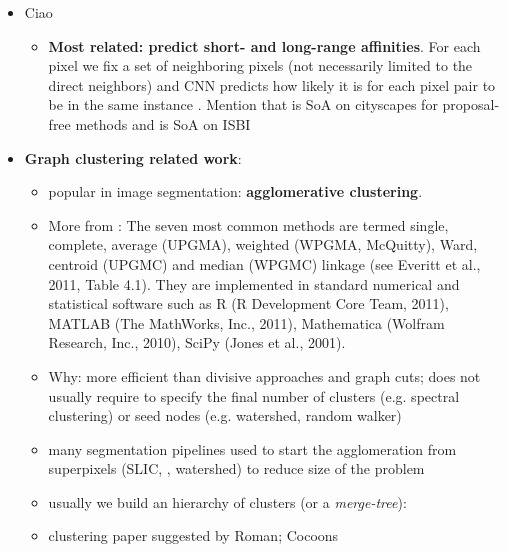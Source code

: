 \begin{itemize}
    \item Ciao
\begin{itemize}
\item \textbf{Most related: predict short- and long-range affinities}. For each pixel we fix a set of neighboring pixels (not necessarily limited to the direct neighbors) and CNN predicts how likely it is for each pixel pair to be in the same instance \cite{liu2018affinity,wolf2018mutex,lee2017superhuman,xie2015holistically,Maire_2016_CVPR}. Mention that  \cite{liu2018affinity} is SoA on cityscapes for proposal-free methods and \cite{wolf2018mutex} is SoA on ISBI

\end{itemize}



\item \textbf{Graph clustering related work}:
\begin{itemize}
    \item popular in image segmentation: \textbf{agglomerative clustering}.
    \item {\small More from \cite{mullner2011modern}: The seven most common methods are termed single, complete, average (UPGMA), weighted (WPGMA, McQuitty), Ward, centroid (UPGMC) and median (WPGMC) linkage (see Everitt et al., 2011, Table 4.1). They are implemented in standard numerical and statistical software such as R (R Development Core Team, 2011), MATLAB (The MathWorks, Inc., 2011), Mathematica (Wolfram Research, Inc., 2010), SciPy (Jones et al., 2001).}
    \item Why: more efficient than divisive approaches and graph cuts; does not usually require to specify the final number of clusters (e.g. spectral clustering) or seed nodes (e.g. watershed, random walker) 
    \item many segmentation pipelines used to start the agglomeration from superpixels (SLIC, \cite{felzenszwalb2004efficient}, watershed) to reduce size of the problem 
    \item usually we build an hierarchy of clusters (or a \emph{merge-tree}): 
    \item clustering paper suggested by Roman; Cocoons


\end{itemize}
\end{itemize}

